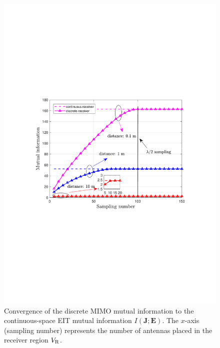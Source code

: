 \documentclass[journal,twocolumn]{IEEEtran}
\begin{document}
\begin{figure}
	\centering
	\includegraphics[width=1.0\linewidth]{figures/discrete_receiver.pdf}
	\caption{Convergence of the discrete MIMO mutual information to the continuous-space EIT mutual information $I({\bm J}; {\bm E})$. The $x$-axis (sampling number) represents the number of antennas placed in the receiver region $V_{\rm R}$. }
	\label{fig:MIMO_EIT_comparison}
\end{figure}

\vspace{-3mm}
\end{document}
